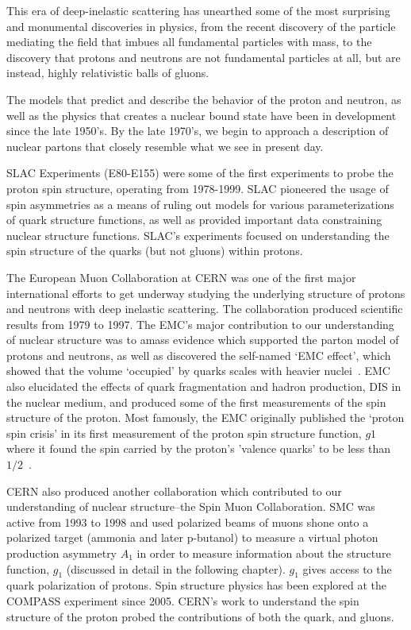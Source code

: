 This era of deep-inelastic scattering has unearthed some of the most surprising
and monumental discoveries in physics, from the recent discovery of the particle
mediating the field that imbues all fundamental particles with mass, to the
discovery that protons and neutrons are not fundamental particles at all, but
are instead, highly relativistic balls of gluons.

The models that predict and describe the behavior of the proton and neutron, as
well as the physics that creates a nuclear bound state have been in development
since the late 1950's. By the late 1970's, we begin to approach a description of
nuclear partons that closely resemble what we see in present day.

SLAC Experiments (E80-E155) were some of the first experiments to probe the
proton spin structure, operating from 1978-1999. SLAC pioneered the usage of
spin asymmetries as a means of ruling out models for various parameterizations
of quark structure functions, as well as provided important data constraining
nuclear structure functions. SLAC's experiments focused on understanding the
spin structure of the quarks (but not gluons) within protons.

The European Muon Collaboration at CERN was one of the first major international
efforts to get underway studying the underlying structure of protons and
neutrons with deep inelastic scattering. The collaboration produced scientific
results from 1979 to 1997. The EMC's major contribution to our understanding of
nuclear structure was to amass evidence which supported the parton model of
protons and neutrons, as well as discovered the self-named `EMC effect', which
showed that the volume `occupied' by quarks scales with heavier
nuclei~\cite{Aubert1983}. EMC also elucidated the effects of quark fragmentation
and hadron production, DIS in the nuclear medium, and produced some of the first
measurements of the spin structure of the proton. Most famously, the EMC
originally published the `proton spin crisis' in its first measurement of the
proton spin structure function, $g1$ where it found the spin carried by the
proton's 'valence quarks' to be less than $1/2$~\cite{Ashman1988}. 

CERN also produced another collaboration which contributed to our understanding
of nuclear structure--the Spin Muon Collaboration. SMC was active from 1993 to
1998 and used polarized beams of muons shone onto a polarized target (ammonia
and later p-butanol) to measure a virtual photon production asymmetry $A_1$ in
order to measure information about the structure function, $g_1$ (discussed in
detail in the following chapter). $g_1$ gives access to the quark polarization
of protons. Spin structure physics has been explored at the COMPASS experiment
since 2005. CERN's work to understand the spin structure of the proton probed
the contributions of both the quark, and gluons. 

